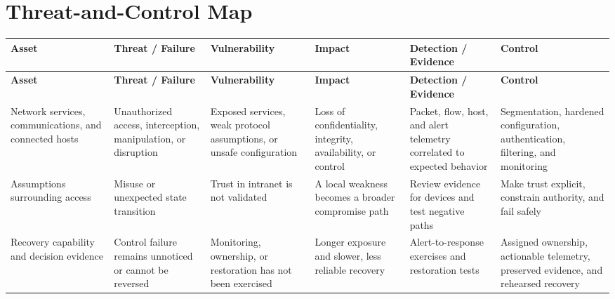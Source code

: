 \documentclass[11pt]{article}
\begin{document}
\section*{Threat-and-Control Map}
\begingroup\scriptsize\setlength{\tabcolsep}{2pt}
\begin{longtable}{>{\RaggedRight\arraybackslash}p{}>{\RaggedRight\arraybackslash}p{}>{\RaggedRight\arraybackslash}p{}>{\RaggedRight\arraybackslash}p{}>{\RaggedRight\arraybackslash}p{}>{\RaggedRight\arraybackslash}p{}}
\toprule\rowcolor{Navy}\color{white}\textbf{Asset} & \color{white}\textbf{Threat / Failure} & \color{white}\textbf{Vulnerability} & \color{white}\textbf{Impact} & \color{white}\textbf{Detection / Evidence} & \color{white}\textbf{Control}\\\midrule
\endfirsthead
\toprule\rowcolor{Navy}\color{white}\textbf{Asset} & \color{white}\textbf{Threat / Failure} & \color{white}\textbf{Vulnerability} & \color{white}\textbf{Impact} & \color{white}\textbf{Detection / Evidence} & \color{white}\textbf{Control}\\\midrule
\endhead
Network services, communications, and connected hosts & Unauthorized access, interception, manipulation, or disruption & Exposed services, weak protocol assumptions, or unsafe configuration & Loss of confidentiality, integrity, availability, or control & Packet, flow, host, and alert telemetry correlated to expected behavior & Segmentation, hardened configuration, authentication, filtering, and monitoring\\\midrule
Assumptions surrounding access & Misuse or unexpected state transition & Trust in intranet is not validated & A local weakness becomes a broader compromise path & Review evidence for devices and test negative paths & Make trust explicit, constrain authority, and fail safely\\\midrule
Recovery capability and decision evidence & Control failure remains unnoticed or cannot be reversed & Monitoring, ownership, or restoration has not been exercised & Longer exposure and slower, less reliable recovery & Alert-to-response exercises and restoration tests & Assigned ownership, actionable telemetry, preserved evidence, and rehearsed recovery\\\midrule
\bottomrule
\end{longtable}
\endgroup
\end{document}
